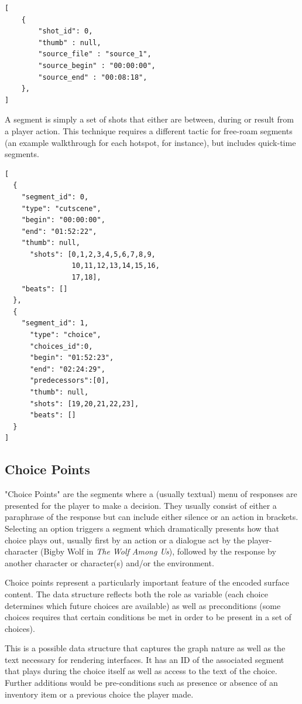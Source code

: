 \documentclass{llncs}
\begin{document}
\begin{verbatim}
[
    {
        "shot_id": 0,
        "thumb" : null,
        "source_file" : "source_1",
        "source_begin" : "00:00:00",
        "source_end" : "00:08:18",
    },
]
\end{verbatim}

A segment is simply a set of shots that either are between, during or
result from a player action. This technique requires a different
tactic for free-roam segments (an example walkthrough for each
hotspot, for instance), but includes quick-time segments.

\begin{verbatim}
[
  {
    "segment_id": 0,
    "type": "cutscene",
    "begin": "00:00:00",
    "end": "01:52:22",
    "thumb": null,
      "shots": [0,1,2,3,4,5,6,7,8,9,
                10,11,12,13,14,15,16,
                17,18],
    "beats": []
  },
  {
    "segment_id": 1,
      "type": "choice",
      "choices_id":0,
      "begin": "01:52:23",
      "end": "02:24:29",
      "predecessors":[0],
      "thumb": null,
      "shots": [19,20,21,22,23],
      "beats": []
  }
]
\end{verbatim}
\subsection*{Choice Points}
\label{sec:orgheadline12}
"Choice Points" are the segments where a (usually textual) menu of
responses are presented for the player to make a decision. They
usually consist of either a paraphrase of the response but can include
either silence or an action in brackets. Selecting an option triggers
a segment which dramatically presents how that choice plays out,
usually first by an action or a dialogue act by the player-character
(Bigby Wolf in \emph{The Wolf Among Us}), followed by the response by
another character or character(s) and/or the environment.

Choice points represent a particularly important feature of the
encoded surface content. The data structure reflects both the role as
variable (each choice determines which future choices are available)
as well as preconditions (some choices requires that certain
conditions be met in order to be present in a set of choices).

This is a possible data structure that captures the graph nature as
well as the text necessary for rendering interfaces. It has an ID of
the associated segment that plays during the choice itself as well as
access to the text of the choice. Further additions would be
pre-conditions such as presence or absence of an inventory item or a
previous choice the player made.
\end{document}
